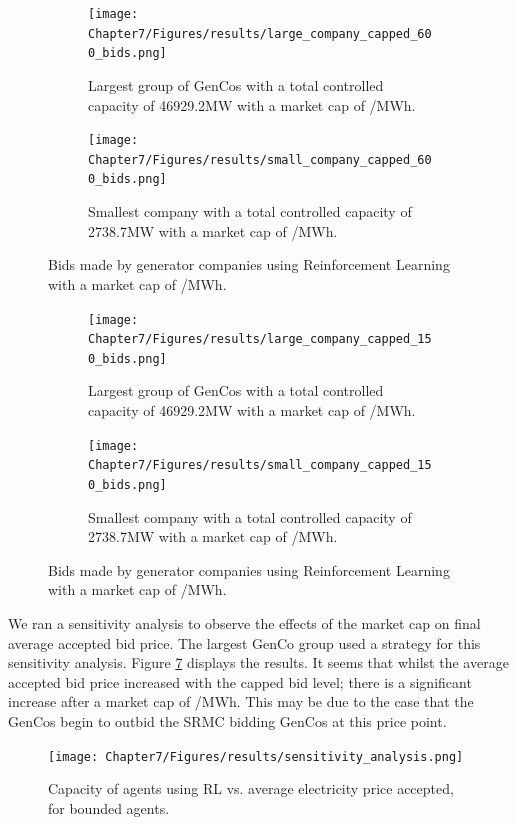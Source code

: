 \begin{figure}
	\centering
	\begin{subfigure}{0.6\textwidth}   
		\texttt{[image: Chapter7/Figures/results/large\_company\_capped\_600\_bids.png]}
		\caption{Largest group of GenCos with a total controlled capacity of 46929.2MW with a market cap of /MWh.}
		\label{fig:large_company_capped_600_bids}
	\end{subfigure}
	\hfil
	\begin{subfigure}{0.6\textwidth}   
		\texttt{[image: Chapter7/Figures/results/small\_company\_capped\_600\_bids.png]}
		\caption{Smallest company with a total controlled capacity of 2738.7MW with a market cap of /MWh.}
		\label{fig:small_company_capped_600_bids}
	\end{subfigure}
	\caption{Bids made by generator companies using Reinforcement Learning with a market cap of /MWh.}
	\label{fig:capped_600_bids}
\end{figure}




\begin{figure}
	\centering
	\begin{subfigure}{0.9\textwidth}  
		\centering 
		\texttt{[image: Chapter7/Figures/results/large\_company\_capped\_150\_bids.png]}
		\caption{Largest group of GenCos with a total controlled capacity of 46929.2MW with a market cap of /MWh.}
		\label{fig:large_company_capped_150_bids}
	\end{subfigure}
	\hfil
	\begin{subfigure}{0.9\textwidth} 
		\centering  
		\texttt{[image: Chapter7/Figures/results/small\_company\_capped\_150\_bids.png]}
		\caption{Smallest company with a total controlled capacity of 2738.7MW with a market cap of /MWh.}
		\label{fig:small_company_capped_150_bids}
	\end{subfigure}
	\caption{Bids made by generator companies using Reinforcement Learning with a market cap of /MWh.}
	\label{fig:capped_150_bids}
\end{figure}

We ran a sensitivity analysis to observe the effects of the market cap on final average accepted bid price. The largest GenCo group used a strategy for this sensitivity analysis. Figure \ref{fig:sensitivity_analysis} displays the results. It seems that whilst the average accepted bid price increased with the capped bid level; there is a significant increase after a market cap of /MWh. This may be due to the case that the GenCos begin to outbid the SRMC bidding GenCos at this price point.
\begin{figure}
	\centering
	\texttt{[image: Chapter7/Figures/results/sensitivity\_analysis.png]}
	\caption{Capacity of agents using RL vs. average electricity price accepted, for bounded agents.}
	\label{fig:sensitivity_analysis}
\end{figure}





